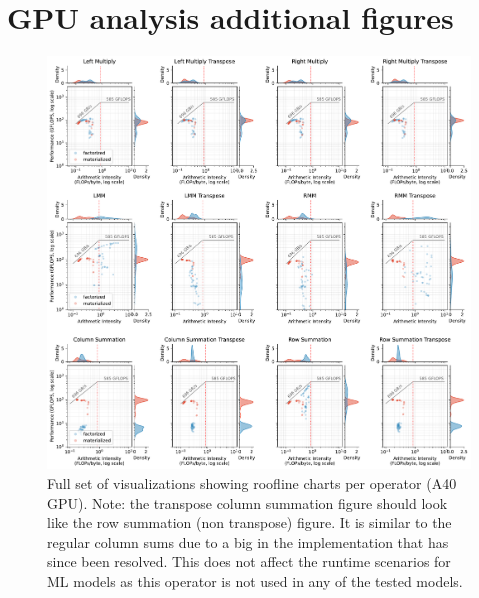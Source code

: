 \chapter{GPU analysis additional figures}
\label{appendix:analysis-additional-figures}
\begin{figure}[ht]
    \centering
    \includegraphics[width=1.0\textwidth]{appendices/figures/roofline-operators.pdf}
    \caption[Roofline charts for all operators]{Full set of visualizations showing roofline charts per operator (A40 GPU). Note: the transpose column summation figure should look like the row summation (non transpose) figure. It is similar to the regular column sums due to a big in the implementation that has since been resolved. This does not affect the runtime scenarios for ML models as this operator is not used in any of the tested models.}
    \label{fig:additional-operator-rooflines}
\end{figure}
